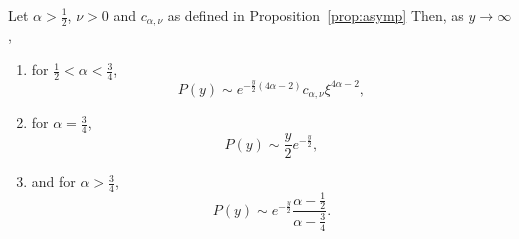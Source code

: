 
\begin{proposition}\label{prop:asymptotics_P}
Let $\alpha > \frac{1}{2}$, $\nu > 0$ and $c_{\alpha,\nu}$ as defined in Proposition~\ref{prop:asymp} Then, as $y \to \infty$, 
\begin{enumerate}
\item for $\frac{1}{2} < \alpha < \frac{3}{4}$,
\[
	P(y) \sim e^{-\frac{y}{2}(4\alpha - 2)} c_{\alpha,\nu} \xi^{4\alpha - 2},
\]
\item for $\alpha = \frac{3}{4}$,
\[
	P(y) \sim \frac{y}{2} e^{-\frac{y}{2}},
\]
\item and for $\alpha > \frac{3}{4}$,
\[
	P(y) \sim e^{-\frac{y}{2}} \frac{\alpha - \frac{1}{2}}{\alpha - \frac{3}{4}}.
\]
\end{enumerate}
\end{proposition}

